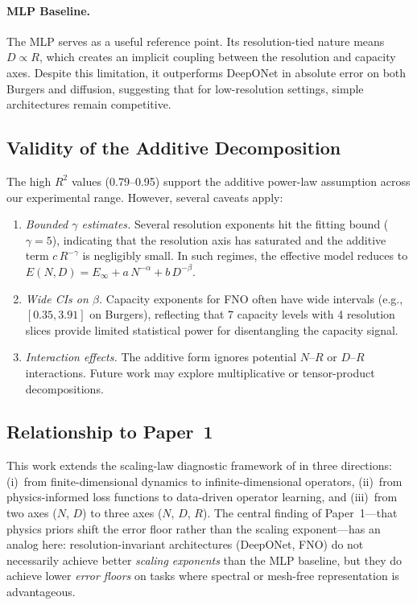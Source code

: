 \documentclass[11pt]{article}
\newcommand{\Einf}{E_\infty}
\begin{document}
\paragraph{MLP Baseline.}
The MLP serves as a useful reference point. Its resolution-tied nature
means $D \propto R$, which creates an implicit coupling between the
resolution and capacity axes. Despite this limitation, it outperforms
DeepONet in absolute error on both Burgers and diffusion, suggesting
that for low-resolution settings, simple architectures remain
competitive.

\subsection{Validity of the Additive Decomposition}

The high $R^2$ values (0.79--0.95) support the additive power-law
assumption across our experimental range. However, several caveats
apply:
\begin{enumerate}
  \item \emph{Bounded $\gamma$ estimates.} Several resolution
    exponents hit the fitting bound ($\gamma = 5$), indicating that
    the resolution axis has saturated and the additive term
    $c\,R^{-\gamma}$ is negligibly small. In such regimes, the
    effective model reduces to $E(N,D) = \Einf + a\,N^{-\alpha} +
    b\,D^{-\beta}$.
  \item \emph{Wide CIs on $\beta$.} Capacity exponents for FNO
    often have wide intervals (e.g., $[0.35, 3.91]$ on Burgers),
    reflecting that 7 capacity levels with 4 resolution slices provide
    limited statistical power for disentangling the capacity signal.
  \item \emph{Interaction effects.} The additive form ignores
    potential $N$--$R$ or $D$--$R$ interactions. Future work may
    explore multiplicative or tensor-product decompositions.
\end{enumerate}

\subsection{Relationship to Paper~1}

This work extends the scaling-law diagnostic framework of
\citet{perrier2025scaling} in three directions: (i)~from
finite-dimensional dynamics to infinite-dimensional operators,
(ii)~from physics-informed loss functions to data-driven operator
learning, and (iii)~from two axes ($N$, $D$) to three axes ($N$, $D$,
$R$). The central finding of Paper~1---that physics priors shift the
error floor rather than the scaling exponent---has an analog here:
resolution-invariant architectures (DeepONet, FNO) do not necessarily
achieve better \emph{scaling exponents} than the MLP baseline, but they
do achieve lower \emph{error floors} on tasks where spectral or mesh-free
representation is advantageous.
\end{document}
